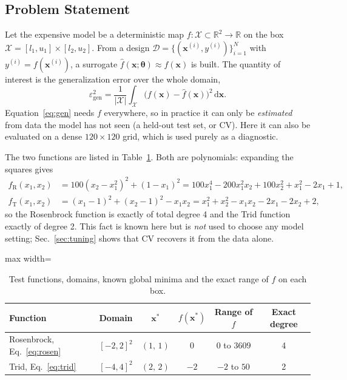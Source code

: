 \subsection{Problem Statement}

Let the expensive model be a deterministic map $f:\mathcal{X}\subset\mathbb{R}^2\rightarrow\mathbb{R}$ on the box $\mathcal{X}=[l_1,u_1]\times[l_2,u_2]$. From a design $\mathcal{D}=\{(\mathbf{x}^{(i)},y^{(i)})\}_{i=1}^{N}$ with $y^{(i)}=f(\mathbf{x}^{(i)})$, a surrogate $\hat f(\mathbf{x};\boldsymbol{\theta})\approx f(\mathbf{x})$ is built. The quantity of interest is the generalization error over the whole domain,
\begin{equation}
  \varepsilon_{\mathrm{gen}}^2=\frac{1}{|\mathcal{X}|}\int_{\mathcal{X}}\big(f(\mathbf{x})-\hat f(\mathbf{x})\big)^2\,\mathrm{d}\mathbf{x}.
  \label{eq:gen}
\end{equation}
Equation~\eqref{eq:gen} needs $f$ everywhere, so in practice it can only be \emph{estimated} from data the model has not seen (a held-out test set, or CV). Here it can also be evaluated on a dense $120\times120$ grid, which is used purely as a diagnostic.

The two functions are listed in Table~\ref{tab:functions}. Both are polynomials: expanding the squares gives
\begin{align}
  f_{\mathrm{R}}(x_1,x_2) &= 100(x_2-x_1^2)^2+(1-x_1)^2 = 100x_1^4-200x_1^2x_2+100x_2^2+x_1^2-2x_1+1, \label{eq:rosen}\\
  f_{\mathrm{T}}(x_1,x_2) &= (x_1-1)^2+(x_2-1)^2-x_1x_2 = x_1^2+x_2^2-x_1x_2-2x_1-2x_2+2, \label{eq:trid}
\end{align}
so the Rosenbrock function is exactly of total degree 4 and the Trid function exactly of degree 2. This fact is known here but is \emph{not} used to choose any model setting; Sec.~\ref{sec:tuning} shows that CV recovers it from the data alone.

\begin{table}[!htbp]
  \centering
  \caption{Test functions, domains, known global minima and the exact range of $f$ on each box.}
  \label{tab:functions}
  \begin{adjustbox}{max width=\linewidth}
  \begin{tabular}{lccccc}
    \toprule
    Function & Domain & $\mathbf{x}^*$ & $f(\mathbf{x}^*)$ & Range of $f$ & Exact degree \\
    \midrule
    Rosenbrock, Eq.~\eqref{eq:rosen} & $[-2,2]^2$ & $(1,\,1)$ & $0$ & $0$ to $3609$ & 4 \\
    Trid, Eq.~\eqref{eq:trid} & $[-4,4]^2$ & $(2,\,2)$ & $-2$ & $-2$ to $50$ & 2 \\
    \bottomrule
  \end{tabular}
  \end{adjustbox}
\end{table}

